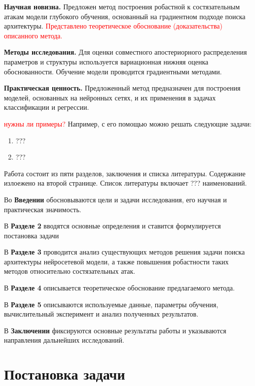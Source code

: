 \documentclass[12pt]{article}
\begin{document}
	\textbf{Научная новизна.} Предложен метод построения робастной к состязательным атакам модели глубокого обучения, основанный на градиентном подходе поиска архитектуры. \textcolor{red}{Представлено теоретическое обоснование (доказательства) описанного метода.}
	
	\textbf{Методы исследования.} Для оценки совместного апостериорного распределения параметров и структуры используется вариационная нижняя оценка обоснованности. Обучение модели проводится градиентными методами.
	
	\textbf{Практическая ценность.} Предложенный метод предназначен для построения моделей, основанных на нейронных сетях, и их применения в задачах классификации и регрессии. 
	
	\textcolor{red}{нужны ли примеры?}
	Например, с его помощью можно решать следующие задачи:
	\begin{enumerate}
		\item ???
		\item ???
	\end{enumerate}
	
	
	Работа состоит из пяти разделов, заключения и списка литературы. Содержание излоежено на второй странице. Список литературы включает ??? наименований.
	
	Во \textbf{Введении} обосновываются цели и задачи исследования, его научная и практическая значимость.
	
	В \textbf{Разделе 2} вводятся основные определения и ставится формулируется постановка задачи
	
	В \textbf{Разделе 3} проводится анализ существующих методов решения задачи поиска архитектуры нейросетевой модели, а также повышения робастности таких методов относительно состязательных атак.
	
	В \textbf{Разделе 4} описывается теоретическое обоснование предлагаемого метода.
	
	В \textbf{Разделе 5} описываются используемые данные, параметры обучения, вычислительный эксперимент и анализ полученных результатов.
	
	В \textbf{Заключении} фиксируются основные результаты работы и указываются направления дальнейших исследований.
	
	
	
	\newpage
	\section{Постановка задачи}
	
\end{document}

